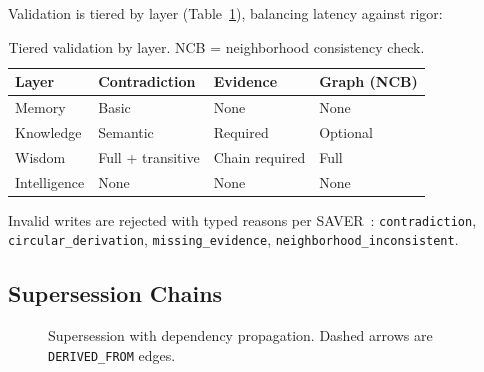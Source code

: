\documentclass[11pt,letterpaper]{article}
\begin{document}
Validation is tiered by layer (Table~\ref{tab:validation}), balancing latency against rigor:

\begin{table}[H]
\centering
\caption{Tiered validation by layer. NCB = neighborhood consistency check.}
\label{tab:validation}
\begin{tabular}{@{}llll@{}}
\toprule
\textbf{Layer} & \textbf{Contradiction} & \textbf{Evidence} & \textbf{Graph (NCB)} \\
\midrule
Memory & Basic & None & None \\
Knowledge & Semantic & Required & Optional \\
Wisdom & Full + transitive & Chain required & Full \\
Intelligence & None & None & None \\
\bottomrule
\end{tabular}
\end{table}

Invalid writes are rejected with typed reasons per SAVER~\cite{yuan2026saver}: \texttt{contradiction}, \texttt{circular\_derivation}, \texttt{missing\_evidence}, \texttt{neighborhood\_inconsistent}.

\subsection{Supersession Chains}

\begin{figure}[H]
\centering
{}
\caption{Supersession with dependency propagation. Dashed arrows are \texttt{DERIVED\_FROM} edges.}
\label{fig:supersession}
\end{figure}
\end{document}
